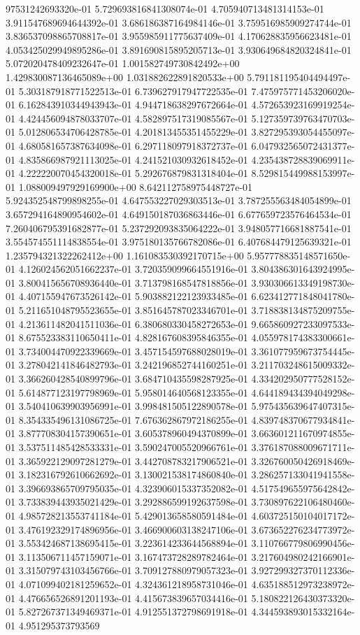 97531242693320e-01	5.729693816841308074e-01	4.705940713481314153e-01	3.911547689694644392e-01	3.686186387164984146e-01	3.759516985909274744e-01	3.836537098865708817e-01	3.955985911775637409e-01	4.170628835956623481e-01	4.053425029949895286e-01	3.891690815895205713e-01	3.930649684820324841e-01	5.072020478409232647e-01	1.001582749730842492e+00	1.429830087136465089e+00	1.031882622891820533e+00	5.791181195404494497e-01	5.303187918771522513e-01	6.739627917947722535e-01	7.475975771453206020e-01	6.162843910344943943e-01	4.944718638297672664e-01	4.572653923169919254e-01	4.424456094878033707e-01	4.582897517319085567e-01	5.127359739763470703e-01	5.012806534706428785e-01	4.201813455351455229e-01	3.827295393054455097e-01	4.680581657387634098e-01	6.297118097918372737e-01	6.047932565072431377e-01	4.835866987921113025e-01	4.241521030932618452e-01	4.235438728839069911e-01	4.222220070454320018e-01	5.292676879831318404e-01	8.529815449988153997e-01	1.088009497929169900e+00	8.642112758975448727e-01	5.924352548799898255e-01	4.647553227029303513e-01	3.787255563484054899e-01	3.657294164890954602e-01	4.649150187036863446e-01	6.677659723576464534e-01	7.260406795391682877e-01	5.237292093835064222e-01	3.948057716681887541e-01	3.554574551114838554e-01	3.975180135766782086e-01	6.407684479125639321e-01	1.235794321322262412e+00	1.161083530392170715e+00	5.957778835148571650e-01	4.126024562051662237e-01	3.720359099664551916e-01	3.804386301643924995e-01	3.800415656708936440e-01	3.713798168547818856e-01	3.930306613349198730e-01	4.407155947673526142e-01	5.903882122123933485e-01	6.623412771848041780e-01	5.211651048795523655e-01	3.851645787023346701e-01	3.718838134875209755e-01	4.213611482041511036e-01	6.380680330458272653e-01	9.665860927233097533e-01	8.675523383110650411e-01	4.828167608395846355e-01	4.055978174383300661e-01	3.734004470922339669e-01	3.457154597688028019e-01	3.361077959673754445e-01	3.278042141846482793e-01	3.242196852744160251e-01	3.211703248615009332e-01	3.366260428540899796e-01	3.684710435598287925e-01	4.334202950777528152e-01	5.614877123197798969e-01	5.958014640568123355e-01	4.644189434394049298e-01	3.540410639903956991e-01	3.998481505122890578e-01	5.975435639647407315e-01	8.354335496131086725e-01	7.676362867972186255e-01	4.839748370677934841e-01	3.877708304157390651e-01	3.605378960494370899e-01	3.663601211670974855e-01	3.537511485428533331e-01	3.590247005520966761e-01	3.376187088009671711e-01	3.365922129097281279e-01	3.442708783217906521e-01	3.326760050426918469e-01	3.182316792610662692e-01	3.130021538174860840e-01	3.286257133041941558e-01	3.396693865709795035e-01	4.323906015337352082e-01	4.517549655975642842e-01	3.733839443935021429e-01	3.292886599192637598e-01	3.730897622106480460e-01	4.985728213553741184e-01	5.429013658580591484e-01	4.603725150104017172e-01	3.476192329174896956e-01	3.466900603138247106e-01	3.673652276234773972e-01	3.553424687138695415e-01	3.223614233644568894e-01	3.110766779806990456e-01	3.113506711457159071e-01	3.167473728289782464e-01	3.217604980242166901e-01	3.315079743103456766e-01	3.709127880979057323e-01	3.927299327370112336e-01	4.071099402181259652e-01	4.324361218958731046e-01	4.635188512973238972e-01	4.476656526891201193e-01	4.415673839657034416e-01	5.180822126430373320e-01	5.827267371349469371e-01	4.912551372798691918e-01	4.344593893015332164e-01	4.951295373793569